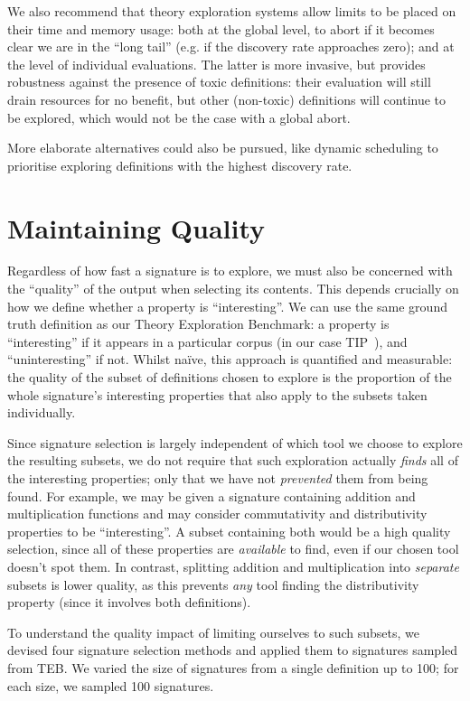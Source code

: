 We also recommend that theory exploration systems allow limits to be placed on
their time and memory usage: both at the global level, to abort if it becomes
clear we are in the ``long tail'' (e.g. if the discovery rate approaches zero);
and at the level of individual evaluations. The latter is more invasive, but
provides robustness against the presence of toxic definitions: their evaluation
will still drain resources for no benefit, but other (non-toxic) definitions
will continue to be explored, which would not be the case with a global abort.

More elaborate alternatives could also be pursued, like dynamic scheduling to
prioritise exploring definitions with the highest discovery rate.

\section{Maintaining Quality}

Regardless of how fast a signature is to explore, we must also be concerned with
the ``quality'' of the output when selecting its contents. This depends
crucially on how we define whether a property is ``interesting''. We can use the
same ground truth definition as our Theory Exploration Benchmark: a property is
``interesting'' if it appears in a particular corpus (in our case
TIP~\cite{claessen2015tip}), and ``uninteresting'' if not. Whilst na\"ive, this
approach is quantified and measurable: the quality of the subset of definitions
chosen to explore is the proportion of the
whole signature's interesting properties that also apply to the subsets taken
individually.

Since signature selection is largely independent of which tool we choose to
explore the resulting subsets, we do not require that such exploration actually
\emph{finds} all of the interesting properties; only that we have not
\emph{prevented} them from being found. For example, we may be given a signature
containing addition and multiplication functions and may consider commutativity
and distributivity properties to be ``interesting''. A subset containing both
would be a high quality selection, since all of these properties are
\emph{available} to find, even if our chosen tool doesn't spot them. In
contrast, splitting addition and multiplication into \emph{separate} subsets is
lower quality, as this prevents \emph{any} tool finding the distributivity
property (since it involves both definitions).

To understand the quality impact of limiting ourselves to such subsets, we
devised four signature selection methods and applied them to signatures sampled
from TEB. We varied the size of signatures from a single definition up to 100;
for each size, we sampled 100 signatures.

